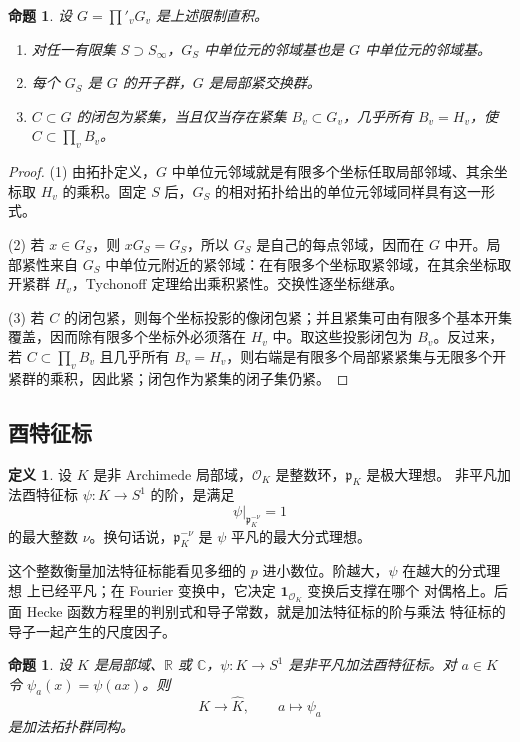 \documentclass[11pt,a4paper,openany]{ctexbook}
\numberwithin{equation}{chapter}
\newcommand{\R}{\mathbb{R}}
\newcommand{\C}{\mathbb{C}}
\theoremstyle{plain}
\newtheorem{proposition}[theorem]{命题}
\theoremstyle{definition}
\newtheorem{definition}[theorem]{定义}
\theoremstyle{remark}
\begin{document}
\begin{proposition}
设 $G=\prod'_vG_v$ 是上述限制直积。
\begin{enumerate}[label=(\arabic*)]
\item 对任一有限集 $S\supset S_\infty$，$G_S$ 中单位元的邻域基也是 $G$ 中单位元的邻域基。
\item 每个 $G_S$ 是 $G$ 的开子群，$G$ 是局部紧交换群。
\item $C\subset G$ 的闭包为紧集，当且仅当存在紧集 $B_v\subset G_v$，几乎所有 $B_v=H_v$，使 $C\subset\prod_vB_v$。
\end{enumerate}
\end{proposition}

\begin{proof}
(1) 由拓扑定义，$G$ 中单位元邻域就是有限多个坐标任取局部邻域、其余坐标取 $H_v$ 的乘积。固定 $S$ 后，$G_S$ 的相对拓扑给出的单位元邻域同样具有这一形式。

(2) 若 $x\in G_S$，则 $xG_S=G_S$，所以 $G_S$ 是自己的每点邻域，因而在 $G$ 中开。局部紧性来自 $G_S$ 中单位元附近的紧邻域：在有限多个坐标取紧邻域，在其余坐标取开紧群 $H_v$，Tychonoff 定理给出乘积紧性。交换性逐坐标继承。

(3) 若 $C$ 的闭包紧，则每个坐标投影的像闭包紧；并且紧集可由有限多个基本开集覆盖，因而除有限多个坐标外必须落在 $H_v$ 中。取这些投影闭包为 $B_v$。反过来，若 $C\subset\prod_vB_v$ 且几乎所有 $B_v=H_v$，则右端是有限多个局部紧紧集与无限多个开紧群的乘积，因此紧；闭包作为紧集的闭子集仍紧。
\end{proof}

\subsection{酉特征标}

\begin{definition}
设 $K$ 是非 Archimede 局部域，$\mathcal O_K$ 是整数环，$\mathfrak p_K$ 是极大理想。
非平凡加法酉特征标 $\psi:K\to S^1$ 的阶，是满足
\[
  \psi|_{\mathfrak p_K^{-\nu}}=1
\]
的最大整数 $\nu$。换句话说，$\mathfrak p_K^{-\nu}$ 是 $\psi$ 平凡的最大分式理想。
\end{definition}

这个整数衡量加法特征标能看见多细的 $p$ 进小数位。阶越大，$\psi$ 在越大的分式理想
上已经平凡；在 Fourier 变换中，它决定 $\mathbf 1_{\mathcal O_K}$ 变换后支撑在哪个
对偶格上。后面 Hecke 函数方程里的判别式和导子常数，就是加法特征标的阶与乘法
特征标的导子一起产生的尺度因子。

\begin{proposition}
设 $K$ 是局部域、$\R$ 或 $\C$，$\psi:K\to S^1$ 是非平凡加法酉特征标。对 $a\in K$ 令 $\psi_a(x)=\psi(ax)$。则
\[
  K\longrightarrow \widehat K,\qquad a\longmapsto \psi_a
\]
是加法拓扑群同构。
\end{proposition}
\end{document}
